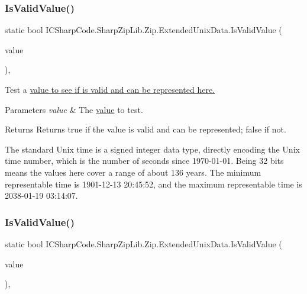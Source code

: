 \subsubsection{\texorpdfstring{Is\+Valid\+Value()}{IsValidValue()}\hspace{0.1cm}{\footnotesize\ttfamily [1/2]}}
{\footnotesize\ttfamily static bool I\+C\+Sharp\+Code.\+Sharp\+Zip\+Lib.\+Zip.\+Extended\+Unix\+Data.\+Is\+Valid\+Value (\begin{DoxyParamCaption}\item[{Date\+Time}]{value }\end{DoxyParamCaption})\hspace{0.3cm}{\ttfamily [inline]}, {\ttfamily [static]}}



Test a \hyperlink{}{value to see if is valid and can be represented here.} 


\begin{DoxyParams}{Parameters}
{\em value} & The \hyperlink{}{value} to test.\\
\hline
\end{DoxyParams}
\begin{DoxyReturn}{Returns}
Returns true if the value is valid and can be represented; false if not.
\end{DoxyReturn}


The standard Unix time is a signed integer data type, directly encoding the Unix time number, which is the number of seconds since 1970-\/01-\/01. Being 32 bits means the values here cover a range of about 136 years. The minimum representable time is 1901-\/12-\/13 20\+:45\+:52, and the maximum representable time is 2038-\/01-\/19 03\+:14\+:07. \mbox{\label{class_i_c_sharp_code_1_1_sharp_zip_lib_1_1_zip_1_1_extended_unix_data_a2643cdcd65d1e051056701e0255596ca}} 
\subsubsection{\texorpdfstring{Is\+Valid\+Value()}{IsValidValue()}\hspace{0.1cm}{\footnotesize\ttfamily [2/2]}}
{\footnotesize\ttfamily static bool I\+C\+Sharp\+Code.\+Sharp\+Zip\+Lib.\+Zip.\+Extended\+Unix\+Data.\+Is\+Valid\+Value (\begin{DoxyParamCaption}\item[{Date\+Time}]{value }\end{DoxyParamCaption})\hspace{0.3cm}{\ttfamily [inline]}, {\ttfamily [static]}}



